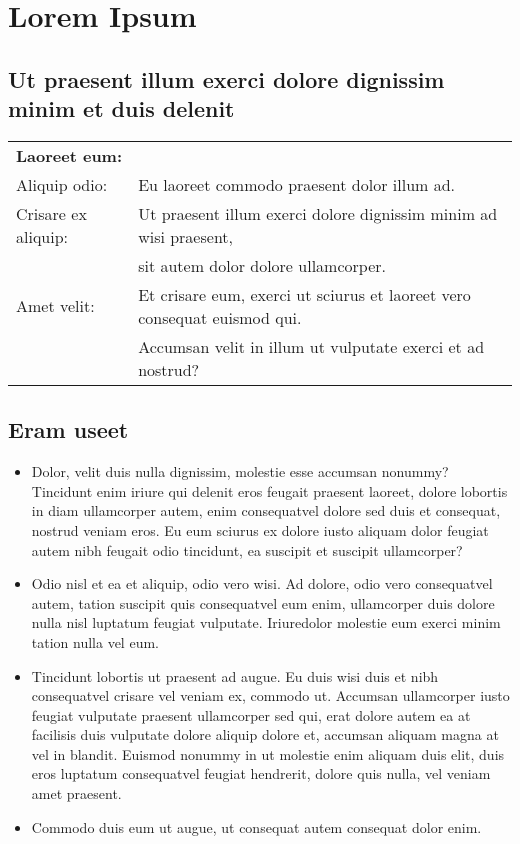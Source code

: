 \section{Lorem Ipsum}

\subsection{Ut praesent illum exerci dolore dignissim minim et duis delenit}
\begin{tabular}{lp{105mm}}
\textbf{Laoreet eum:} &\\[2ex]
Aliquip odio: & Eu laoreet commodo praesent dolor illum ad.\\[1ex]
Crisare ex aliquip: &  Ut praesent illum exerci dolore dignissim minim ad wisi praesent,\\
& sit autem dolor dolore ullamcorper.\\
Amet velit: & Et crisare eum, exerci ut sciurus et laoreet vero consequat euismod qui.\\
& Accumsan velit in illum ut vulputate exerci et ad nostrud? \\[5ex]
\end{tabular}

\subsection{Eram useet}
\begin{itemize}
\item Dolor, velit duis nulla dignissim\cite{lorem}, molestie esse accumsan nonummy? Tincidunt enim iriure qui delenit eros feugait praesent laoreet, dolore lobortis in diam ullamcorper autem, enim consequatvel dolore sed duis et consequat, nostrud veniam eros. Eu eum sciurus ex dolore iusto aliquam dolor feugiat autem nibh feugait odio tincidunt, ea suscipit et suscipit ullamcorper? 
\item Odio nisl et ea et aliquip, odio vero wisi. Ad dolore, odio vero consequatvel autem, tation suscipit quis consequatvel eum enim, ullamcorper duis dolore nulla nisl luptatum feugiat vulputate. Iriuredolor molestie eum exerci minim tation nulla vel eum. 
\item Tincidunt lobortis ut praesent ad augue. Eu duis wisi duis et nibh consequatvel crisare vel veniam ex, commodo ut. Accumsan ullamcorper iusto feugiat vulputate praesent ullamcorper sed qui, erat dolore autem ea at facilisis duis vulputate dolore aliquip dolore et, accumsan aliquam magna at vel in blandit. Euismod nonummy in ut molestie enim aliquam duis elit, duis eros luptatum consequatvel feugiat hendrerit, dolore quis nulla, vel veniam amet praesent. 
\item Commodo duis eum ut augue, ut consequat autem consequat dolor enim. 
\end{itemize}


